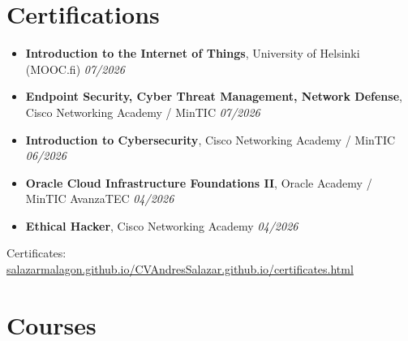 \documentclass[letterpaper,12pt]{article}
\begin{document}
\section*{\textcolor{primary}{Certifications}}
\begin{itemize}[itemsep=0pt, topsep=5pt]
    \item \textbf{Introduction to the Internet of Things}, University of Helsinki (MOOC.fi) \hfill \textit{07/2026}
    \item \textbf{Endpoint Security, Cyber Threat Management, Network Defense}, Cisco Networking Academy / MinTIC \hfill \textit{07/2026}
    \item \textbf{Introduction to Cybersecurity}, Cisco Networking Academy / MinTIC \hfill \textit{06/2026}
    \item \textbf{Oracle Cloud Infrastructure Foundations II}, Oracle Academy / MinTIC AvanzaTEC \hfill \textit{04/2026}
    \item \textbf{Ethical Hacker}, Cisco Networking Academy \hfill \textit{04/2026}
\end{itemize}
Certificates: \href{https://salazarmalagon.github.io/CVAndresSalazar.github.io/certificates.html}{salazarmalagon.github.io/CVAndresSalazar.github.io/certificates.html}

\section*{\textcolor{primary}{Courses}}

\end{document}
